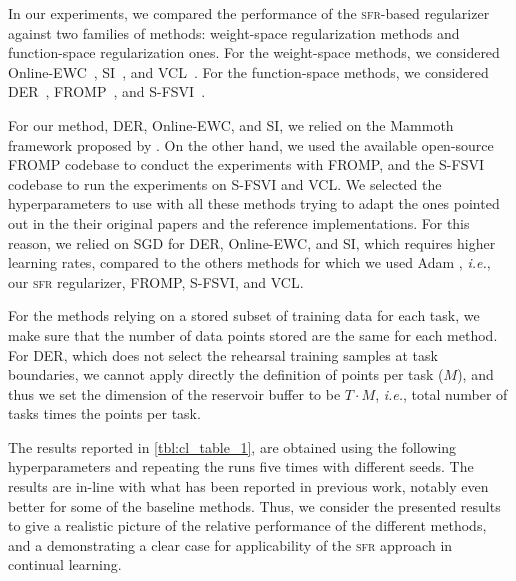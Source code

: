 \documentclass{article} %
\makeatletter
\newcommand{\ie}{\textit{i.e.\@}\xspace}
\newcommand{\our}{\textsc{sfr}\xspace}
\makeatother
\begin{document}
In our experiments, we compared the performance of the \our-based regularizer against two families of methods: weight-space regularization methods and function-space regularization ones.
For the weight-space methods, we considered Online-EWC~\citep{schwarz2018progress}, SI~\citep{zenke2017continual}, and VCL~\citep{nguyen2018variational}.  %
For the function-space methods, we considered DER~\citep{buzzega2020dark}, FROMP~\citep{pan2020continual}, and S-FSVI~\citep{rudner2022continual}.

For our method, DER, Online-EWC, and SI, we relied on the Mammoth framework proposed by \citep{buzzega2020dark}. On the other hand, we used the available open-source FROMP codebase to conduct the experiments with FROMP, and the S-FSVI codebase to run the experiments on S-FSVI and VCL. We selected the hyperparameters to use with all these methods trying to adapt the ones pointed out in the their original papers and the reference implementations. For this reason, we relied on SGD for DER, Online-EWC, and SI, which requires higher learning rates, compared to the others methods for which we used Adam \cite{adam}, \ie, our \our regularizer, FROMP, S-FSVI, and VCL.

For the methods relying on a stored subset of training data for each task, we make sure that the number of data points stored are the same for each method. For DER, which does not select the rehearsal training samples at task boundaries, we cannot apply directly the definition of points per task ($M$), and thus we set the dimension of the reservoir buffer to be $T \cdot M$, \ie, total number of tasks times the points per task.

The results reported in \cref{tbl:cl_table_1}, are obtained using the following hyperparameters and repeating the runs five times with different seeds. The results are in-line with what has been reported in previous work, notably even better for some of the baseline methods. Thus, we consider the presented results to give a realistic picture of the relative performance of the different methods, and a demonstrating a clear case for applicability of the \our approach in continual learning.

\end{document}
